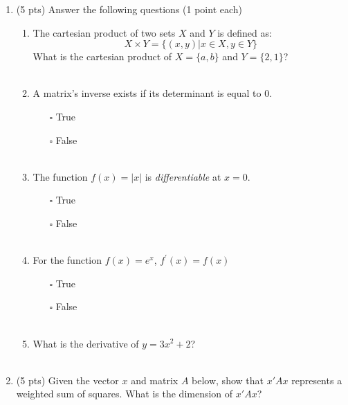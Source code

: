\documentclass{./../../../Latex/tests}
\begin{document}
\thispagestyle{plain}

\vspace{0.5em}


\begin{enumerate}	
\item (5 pts) Answer the following questions (1 point each)
\begin{enumerate}
	\item The cartesian product of two sets $X$ and $Y$ is defined as: $$ X \times Y = \{(x,y) | x \in X, y \in Y\} $$
  	What is the cartesian product of $X=\{a,b\}$ and $Y=\{2,1\}$? \\~\\ \vspace{3cm}
  	\item A matrix's inverse exists if its determinant is equal to 0. 
  \begin{itemize}
  	\item[$\square$] True 
  	\item[$\square$] False \\~\\
  \end{itemize}
  \item The function $f(x) = |x|$ is \textit{differentiable} at $x=0$.
  \begin{itemize}
  	\item[$\square$] True 
  	\item[$\square$] False \\~\\
  \end{itemize}
    \item For the function $f(x) = e^x$, $f^{\prime} (x)=f(x)$ 
  \begin{itemize}
  	\item[$\square$] True 
  	\item[$\square$] False \\~\\
  \end{itemize}
  \item What is the derivative of $y=3x^2+2$? \\~\\ \vspace{2em}
  
\end{enumerate}


\newpage
\item (5 pts) Given the vector $x$ and matrix $A$ below, show that $x'Ax$ represents a weighted sum of squares. What is the dimension of $x'Ax$?


\end{enumerate}
\end{document}
